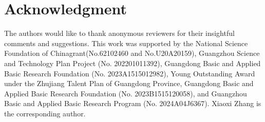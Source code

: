 
\section*{Acknowledgment}

The authors would like to thank anonymous reviewers for their insightful comments and suggestions. This work was supported by the National Science Foundation of Chinagrant(No.62102460 and No.U20A20159), Guangzhou Science and Technology Plan Project (No. 202201011392), Guangdong Basic and Applied Basic Research Foundation (No. 2023A1515012982), Young Outstanding Award under the Zhujiang Talent Plan of Guangdong Province, Guangdong Basic and Applied Basic Research Foundation (No. 2023B1515120058), and Guangzhou Basic and Applied Basic Research Program (No. 2024A04J6367). Xiaoxi Zhang is the corresponding author.



